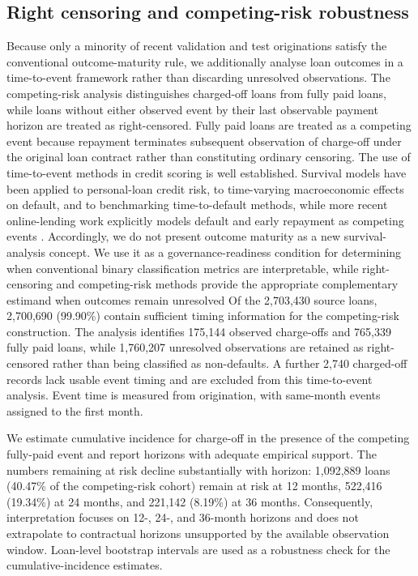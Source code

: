 \documentclass[10pt]{article}
\begin{document}
\subsection{Right censoring and competing-risk robustness}
\label{sec:competingrisk}

Because only a minority of recent validation and test originations satisfy the conventional outcome-maturity rule, we additionally analyse loan outcomes in a time-to-event framework rather than discarding unresolved observations. The competing-risk analysis distinguishes charged-off loans from fully paid loans, while loans without either observed event by their last observable payment horizon are treated as right-censored. Fully paid loans are treated as a competing event because repayment terminates subsequent observation of charge-off under the original loan contract rather than constituting ordinary censoring. The use of time-to-event methods in credit scoring is well established. Survival models have been applied to personal-loan credit risk, to time-varying macroeconomic effects on default, and to benchmarking time-to-default methods, while more recent online-lending work explicitly models default and early repayment as competing events \cite{ref49,ref50,ref51,ref52}. Accordingly, we do not present outcome maturity as a new survival-analysis concept. We use it as a governance-readiness condition for determining when conventional binary classification metrics are interpretable, while right-censoring and competing-risk methods provide the appropriate complementary estimand when outcomes remain unresolved Of the 2,703,430 source loans, 2,700,690 (99.90\%) contain sufficient timing information for the competing-risk construction. The analysis identifies 175,144 observed charge-offs and 765,339 fully paid loans, while 1,760,207 unresolved observations are retained as right-censored rather than being classified as non-defaults. A further 2,740 charged-off records lack usable event timing and are excluded from this time-to-event analysis. Event time is measured from origination, with same-month events assigned to the first month.

We estimate cumulative incidence for charge-off in the presence of the competing fully-paid event and report horizons with adequate empirical support. The numbers remaining at risk decline substantially with horizon: 1,092,889 loans (40.47\% of the competing-risk cohort) remain at risk at 12 months, 522,416 (19.34\%) at 24 months, and 221,142 (8.19\%) at 36 months. Consequently, interpretation focuses on 12-, 24-, and 36-month horizons and does not extrapolate to contractual horizons unsupported by the available observation window. Loan-level bootstrap intervals are used as a robustness check for the cumulative-incidence estimates.
\end{document}
